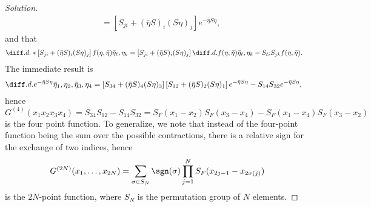 \begin{proof}[Solution]
\begin{align*}
      &= \left[S_{ji} + (\bar{\eta} S)_i (S \eta)_j\right]e^{- \bar{\eta} S \eta},
   \end{align*}
   and that
   \begin{align*}
      \diff.d.*{\left[S_{ji} + (\bar{\eta} S)_i(S \eta)_j\right]f(\eta, \bar{\eta})}{\bar{\eta}_\ell,\eta_k}
      &= \left[S_{ji} + (\bar{\eta} S)_i (S \eta)_j\right] \diff.d.{f(\eta, \bar{\eta})}{\bar{\eta}_\ell,\eta_k} - S_{\ell i}S_{jk} f(\eta, \bar{\eta}).
   \end{align*}
   The immediate result is
   \begin{align*}
      \diff.d.{e^{- \bar{\eta} S \eta}}{\bar{\eta}_1,\eta_2,\bar{\eta}_3,\eta_4} 
      &= \left[S_{34}  + (\bar{\eta} S)_4 (S \eta)_3\right]\left[S_{12}  + (\bar{\eta} S)_2 (S \eta)_1\right]e^{- \bar{\eta} S \eta} - S_{14} S_{32} e^{- \bar{\eta} S \eta},
   \end{align*}
   hence
   \begin{equation*}
      G^{(4)}(x_1 x_2 x_3 x_4) = S_{34} S_{12} - S_{14} S_{32} = S_F(x_1 - x_2) S_F(x_3 - x_4) - S_F(x_1 - x_4) S_F(x_3 - x_2)
   \end{equation*}
   is the four point function. To generalize, we note that instead of the four-point function being the sum over the possible contractions, there is a relative sign for the exchange of two indices, hence
   \begin{equation*}
      G^{(2N)}(x_1, \dots, x_{2N}) = \sum_{\sigma \in S_N} \sgn(\sigma) \prod_{j = 1}^N S_F(x_{2j-1} - x_{2\sigma(j)})
   \end{equation*}
   is the \(2N\)-point function, where \(S_N\) is the permutation group of \(N\) elements.
\end{proof}
